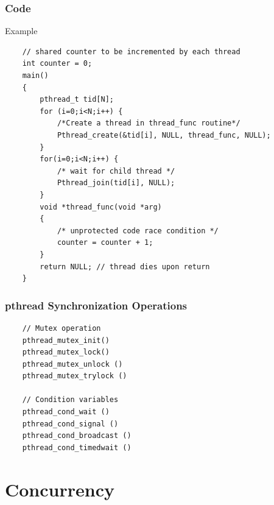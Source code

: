 \documentclass[12pt]{article}
\begin{document}
\subsubsection{Code}
Example
\begin{lstlisting}
    // shared counter to be incremented by each thread
    int counter = 0;
    main()
    {
        pthread_t tid[N];
        for (i=0;i<N;i++) {
            /*Create a thread in thread_func routine*/
            Pthread_create(&tid[i], NULL, thread_func, NULL);
        }
        for(i=0;i<N;i++) {
            /* wait for child thread */
            Pthread_join(tid[i], NULL);
        }
        void *thread_func(void *arg)
        {
            /* unprotected code race condition */
            counter = counter + 1;
        }
        return NULL; // thread dies upon return
    }
\end{lstlisting}
\subsubsection{pthread Synchronization Operations}
\begin{lstlisting}
    // Mutex operation
    pthread_mutex_init()
    pthread_mutex_lock()
    pthread_mutex_unlock ()
    pthread_mutex_trylock ()

    // Condition variables
    pthread_cond_wait ()
    pthread_cond_signal ()
    pthread_cond_broadcast ()
    pthread_cond_timedwait ()
\end{lstlisting}

\section{Concurrency}
\end{document}
